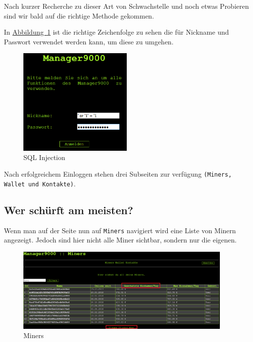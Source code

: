 \documentclass[12pt,a4paper,titlepage,oneside]{scrartcl}
\begin{document}
Nach kurzer Recherche zu dieser Art von Schwachstelle und noch etwas Probieren sind wir bald auf die richtige Methode gekommen.

In \hyperref[fig:sql_injection]{Abbildung~\ref*{fig:sql_injection}} ist die richtige Zeichenfolge zu sehen die für Nickname und Passwort verwendet werden kann, um diese zu umgehen.

\begin{figure}[h!]
  \centering
  \includegraphics[width=0.5\textwidth]{./imgs/manager9000/m9000_sql_injection.png}
\caption{SQL Injection}
\label{fig:sql_injection}
\end{figure}

Nach erfolgreichem Einloggen stehen drei Subseiten zur verfügung \lstinline{(Miners, Wallet und Kontakte)}.

\pagebreak

\subsection{Wer schürft am meisten?}

Wenn man auf der Seite nun auf \lstinline{Miners} navigiert wird eine Liste von Minern angezeigt.
Jedoch sind hier nicht alle Miner sichtbar, sondern nur die eigenen.

\begin{figure}[h!]
  \centering
  \includegraphics[width=0.95\textwidth]{./imgs/manager9000/miners_red.png}
\caption{Miners}
\label{fig:miners}
\end{figure}
\end{document}
